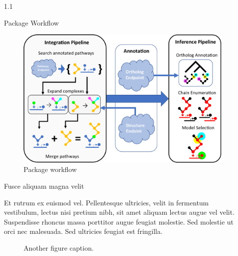 \documentclass[final]{beamer}
\newlength{\sepwidth}
\newlength{\colwidth}
\newcommand{\separatorcolumn}{\begin{column}{\sepwidth}\end{column}}
\begin{document}
\begin{frame}[t]
\begin{columns}[t]
\begin{column}{1.1\colwidth}
\begin{block}{Package Workflow}
    \begin{figure}
      \centering
      \includegraphics[scale=1.75]{Image/schematic.pdf}
      \caption{Package workflow}
    \end{figure}

  \end{block}

  \begin{block}{Fusce aliquam magna velit}

    Et rutrum ex euismod vel. Pellentesque ultricies, velit in fermentum
    vestibulum, lectus nisi pretium nibh, sit amet aliquam lectus augue vel
    velit. Suspendisse rhoncus massa porttitor augue feugiat molestie. Sed
    molestie ut orci nec malesuada. Sed ultricies feugiat est fringilla.

    \begin{figure}
      \centering
      \caption{Another figure caption.}
    \end{figure}

  \end{block}

\end{column}

\separatorcolumn


\end{columns}
\end{frame}
\end{document}
